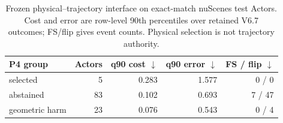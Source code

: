 \begin{table}[t]
  \centering
  \caption{Frozen physical--trajectory interface on exact-match nuScenes test Actors. Cost and error are row-level 90th
  percentiles over retained V6.7 outcomes; FS/flip gives event counts. Physical selection is not trajectory authority.}
  \label{tab:p5-dual-authority}
  \small
  \setlength{\tabcolsep}{3.6pt}
  \begin{tabular}{lrrrr}
    \toprule
    P4 group & Actors & q90 cost $\downarrow$ & q90 error $\downarrow$ & FS / flip $\downarrow$ \\
    \midrule
    selected & 5 & 0.283 & 1.577 & 0 / 0 \\
    abstained & 83 & 0.102 & 0.693 & 7 / 47 \\
    geometric harm & 23 & 0.076 & 0.543 & 0 / 4 \\
    \bottomrule
  \end{tabular}
\end{table}

